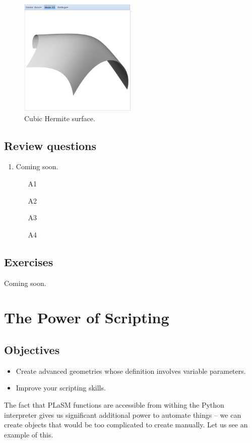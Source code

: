 \documentclass{article}
\begin{document}
\begin{figure}[!ht]
\begin{center}
\includegraphics[width=0.5\textwidth]{img/curves-14.png}
\end{center}
\vspace{-2mm}
\caption{Cubic Hermite surface.}
\label{fig:curves-14}
\end{figure}

\subsection{Review questions}

\begin{enumerate}
\item Coming soon.
\begin{itemize}
\item[A1]
\item[A2]
\item[A3]
\item[A4]
\end{itemize}
\end{enumerate}

\subsection{Exercises}

Coming soon.

\section{The Power of Scripting}

\subsection{Objectives}
\begin{itemize}
\item Create advanced geometries whose definition involves variable parameters.
\item Improve your scripting skills.
\end{itemize}
The fact that PLaSM functions are accessible from withing the Python 
interpreter gives us significant additional power to automate things 
-- we can create objects that would be too complicated to create manually. 
Let us see an example of this.
\end{document}

